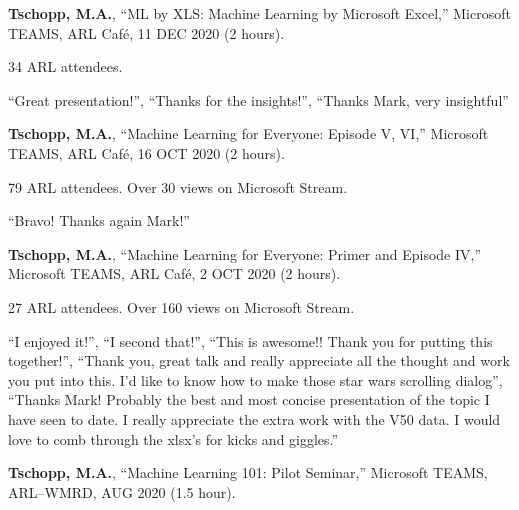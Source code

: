 \begin{cvlist}
\item
\textbf{Tschopp, M.A.}, ``ML by XLS: Machine Learning by Microsoft Excel,'' Microsoft TEAMS, ARL Caf\'{e}, 11 DEC 2020 (2 hours).
\begin{list2}
\item[$\star$] 34 ARL attendees. 
\item[$\star$] ``Great presentation!'', ``Thanks for the insights!'', ``Thanks Mark, very insightful''  
\end{list2}

\item
\textbf{Tschopp, M.A.}, ``Machine Learning for Everyone: Episode V, VI,'' Microsoft TEAMS, ARL Caf\'{e}, 16 OCT 2020 (2 hours).
\begin{list2}
\item[$\star$] 79 ARL attendees. Over 30 views on Microsoft Stream. 
\item[$\star$] ``Bravo! Thanks again Mark!''
\end{list2}

\item
\textbf{Tschopp, M.A.}, ``Machine Learning for Everyone: Primer and Episode IV,'' Microsoft TEAMS, ARL Caf\'{e}, 2 OCT 2020 (2 hours).
\begin{list2}
\item[$\star$] 27 ARL attendees. Over 160 views on Microsoft Stream. 
\item[$\star$] ``I enjoyed it!'', ``I second that!'', ``This is awesome!! Thank you for putting this together!'', ``Thank you, great talk and really appreciate all the thought and work you put into this. I'd like to know how to make those star wars scrolling dialog'', ``Thanks Mark! Probably the best and most concise presentation of the topic I have seen to date. I really appreciate the extra work with the V50 data. I would love to comb through the xlsx's for kicks and giggles.''  
\end{list2}

\item
\textbf{Tschopp, M.A.}, ``Machine Learning 101: Pilot Seminar,'' Microsoft TEAMS, ARL--WMRD, AUG 2020 (1.5 hour).

\end{cvlist}
